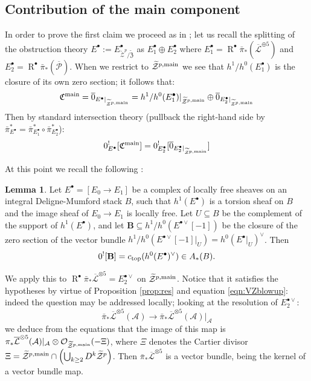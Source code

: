 \documentclass[11pt]{amsart}
\newcommand{\pazocal}{\mathcal}
\newcommand{\tZ}{\widetilde{\pazocal Z}}
\newcommand{\tZp}{\widetilde{\pazocal Z}^p}
\newcommand{\tXP}{\widetilde{\mathfrak Z}}
\newcommand{\OO}{\mathcal{O}}
\renewcommand{\to}{\rightarrow}
\newcommand{\A}{\mathcal A}
\newcommand{\R}{\operatorname{R}^{\bullet}}
\newcommand{\hL}{\overline{\mathcal{L}}}
\theoremstyle{definition}
\newtheorem{lem}[thm]{Lemma}
\theoremstyle{definition}
\begin{document}
\subsection{Contribution of the main component}
In order to prove the first claim we proceed as in \cite[\S5]{CLpfields}; let us recall the splitting of the obstruction theory $E^{\bullet}:=E^{\bullet}_{\tZp/\tXP}$ as $E^{\bullet}_1\oplus E^{\bullet}_2$ where $E^{\bullet}_1=\R\bar\pi_*(\hL^{\oplus 5})$ and $E^{\bullet}_2=\R\bar\pi_*(\overline{\mathcal P})$. When we restrict to $\tZ^{p,\rm{main}}$ we see that $h^1/h^0(E^{\bullet}_1)$ is the closure of its own zero section; it follows that:
\[
 \mathfrak C^{\rm{main}}=\overline{0}_{E^{\bullet}\rvert_{\tZ^{p,\rm{main}}}}=h^1/h^0(E^{\bullet}_1)\rvert_{\tZ^{p,\rm{main}}}\oplus \overline{0}_{E^{\bullet}_2\rvert_{\tZ^{p,\rm{main}}}}
\]
Then by standard intersection theory (pullback the right-hand side by $\bar\pi_{E^{\bullet}}^*=\bar\pi_{E^{\bullet}_1}^*\circ\bar\pi_{E^{\bullet}_2}^*$):
\[
 0^!_{E^{\bullet}}[\mathfrak C^{\rm{main}}]=0_{E^{\bullet}_2}^![\overline{0}_{E^{\bullet}_2\rvert_{\tZ^{p,\rm{main}}}}]
\]

At this point we recall the following \cite[Lemma 5.3]{CLpfields}:
\begin{lem}
Let $E^{\bullet}=[E_0\to E_1]$ be a complex of locally free sheaves on an integral Deligne-Mumford stack $B$, such that
$h^1(E^{\bullet})$ is a torsion sheaf on $B$ and the image sheaf of $E_0\to E_1$ is locally free.
Let $U\subseteq B$ be the complement of the support of $h^1(E^{\bullet})$, and let $\mathbf{B}\subseteq h^1/h^0(E^{\bullet\vee}[-1])$
be the closure of the zero section  of the vector bundle $h^1/h^0(E^{\bullet\vee}[-1]|_U)= h^0(E^{\bullet}|_U)^\vee$. Then
$$0^![\mathbf{B}]=c_{\rm{top}}(h^0(E^{\bullet})^\vee)\in A_*(B).
$$
\end{lem}

We apply this to $\R\bar{\pi}_*\hL^{\otimes 5}=E^{\bullet\vee}_2$ on $\tZ^{p,\rm{main}}$. Notice that it satisfies the hypotheses by virtue of Proposition \ref{prop:res} and equation \eqref{eqn:VZblowup}: indeed the question may be addressed locally; looking at the resolution of $E^{\bullet\vee}_2$:
\[
 \bar\pi_*\hL^{\otimes 5}(\A)\to \bar\pi_*\hL^{\otimes 5}(\A)\rvert_{\A}
\]
we deduce from the equations that the image of this map is $\pi_*\hL^{\otimes 5}(\A)\rvert_{\A}\otimes\OO_{\tZ^{p,\rm{main}}}(-\Xi)$, where $\Xi$ denotes the Cartier divisor $\Xi=\tZ^{p,\rm{main}}\cap\left(\bigcup_{k\geq 2}D^k\tZp\right)$. Then $\bar\pi_*\hL^{\otimes 5}$ is a vector bundle, being the kernel of a vector bundle map.
\end{document}
